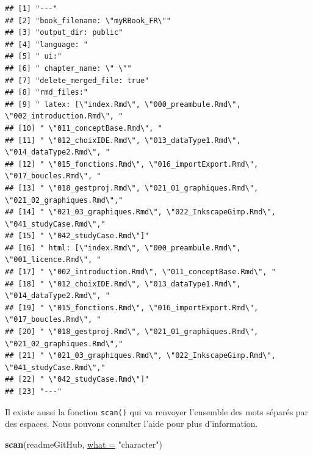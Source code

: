 \documentclass[twoside,symmetric]{book}
\newenvironment{Shaded}{}{}
\newcommand{\DataTypeTok}[1]{\underline{#1}}
\newcommand{\KeywordTok}[1]{\textbf{#1}}
\newcommand{\NormalTok}[1]{#1}
\newcommand{\StringTok}[1]{#1}
\begin{document}
\begin{verbatim}
## [1] "---"
## [2] "book_filename: \"myRBook_FR\""
## [3] "output_dir: public"
## [4] "language: "
## [5] " ui:"
## [6] " chapter_name: \" \""
## [7] "delete_merged_file: true"
## [8] "rmd_files:"
## [9] " latex: [\"index.Rmd\", \"000_preambule.Rmd\",
\"002_introduction.Rmd\", "
## [10] " \"011_conceptBase.Rmd\", "
## [11] " \"012_choixIDE.Rmd\", \"013_dataType1.Rmd\",
\"014_dataType2.Rmd\", "
## [12] " \"015_fonctions.Rmd\", \"016_importExport.Rmd\",
\"017_boucles.Rmd\", "
## [13] " \"018_gestproj.Rmd\", \"021_01_graphiques.Rmd\",
\"021_02_graphiques.Rmd\","
## [14] " \"021_03_graphiques.Rmd\", \"022_InkscapeGimp.Rmd\",
\"041_studyCase.Rmd\","
## [15] " \"042_studyCase.Rmd\"]"
## [16] " html: [\"index.Rmd\", \"000_preambule.Rmd\",
\"001_licence.Rmd\", "
## [17] " \"002_introduction.Rmd\", \"011_conceptBase.Rmd\", "
## [18] " \"012_choixIDE.Rmd\", \"013_dataType1.Rmd\",
\"014_dataType2.Rmd\", "
## [19] " \"015_fonctions.Rmd\", \"016_importExport.Rmd\",
\"017_boucles.Rmd\", "
## [20] " \"018_gestproj.Rmd\", \"021_01_graphiques.Rmd\",
\"021_02_graphiques.Rmd\","
## [21] " \"021_03_graphiques.Rmd\", \"022_InkscapeGimp.Rmd\",
\"041_studyCase.Rmd\","
## [22] " \"042_studyCase.Rmd\"]"
## [23] "---"
\end{verbatim}

Il existe aussi la fonction \texttt{scan()} qui va renvoyer l'ensemble des mots séparés par des espaces. Nous pouvons consulter l'aide pour plus d'information.

\begin{Shaded}
\begin{Highlighting}[]
\KeywordTok{scan}\NormalTok{(readmeGitHub, }\DataTypeTok{what =} \StringTok{"character"}\NormalTok{)}
\end{Highlighting}
\end{Shaded}
\end{document}

